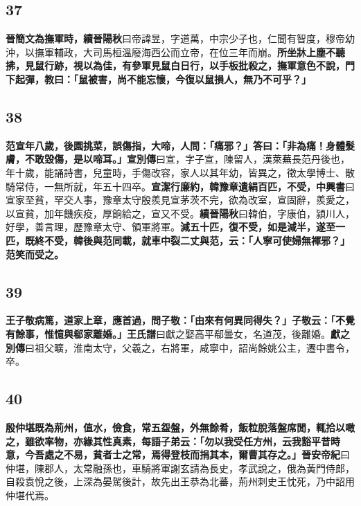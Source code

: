 \subsection*{37}

\textbf{晉簡文為撫軍時，}{\footnotesize \textbf{續晉陽秋}曰帝諱昱，字道萬，中宗少子也，仁聞有智度，穆帝幼沖，以撫軍輔政，大司馬桓溫廢海西公而立帝，在位三年而崩。}\textbf{所坐牀上塵不聽拂，見鼠行跡，視以為佳，有參軍見鼠白日行，以手板批殺之，撫軍意色不說，門下起彈，教曰：「鼠被害，尚不能忘懷，今復以鼠損人，無乃不可乎？」}

\subsection*{38}

\textbf{范宣年八歲，後園挑菜，誤傷指，大啼，人問：「痛邪？」答曰：「非為痛！身體髮膚，不敢毀傷，是以啼耳。」}{\footnotesize \textbf{宣別傳}曰宣，字子宣，陳留人，漢萊蕪長范丹後也，年十歲，能誦詩書，兒童時，手傷改容，家人以其年幼，皆異之，徵太學博士、散騎常侍，一無所就，年五十四卒。}\textbf{宣潔行廉約，韓豫章遺絹百匹，不受，}{\footnotesize \textbf{中興書}曰宣家至貧，罕交人事，豫章太守殷羨見宣茅茨不完，欲為改室，宣固辭，羨愛之，以宣貧，加年饑疾疫，厚餉給之，宣又不受。\textbf{續晉陽秋}曰韓伯，字康伯，潁川人，好學，善言理，歷豫章太守、領軍將軍。}\textbf{減五十匹，復不受，如是減半，遂至一匹，既終不受，韓後與范同載，就車中裂二丈與范，云：「人寧可使婦無褌邪？」范笑而受之。}

\subsection*{39}

\textbf{王子敬病篤，道家上章，應首過，問子敬：「由來有何異同得失？」子敬云：「不覺有餘事，惟憶與郗家離婚。」}{\footnotesize \textbf{王氏譜}曰獻之娶高平郗曇女，名道茂，後離婚。\textbf{獻之別傳}曰祖父曠，淮南太守，父羲之，右將軍，咸寧中，詔尚餘姚公主，遷中書令，卒。}

\subsection*{40}

\textbf{殷仲堪既為荊州，值水，儉食，常五盌盤，外無餘肴，飯粒脫落盤席閒，輒拾以噉之，雖欲率物，亦緣其性真素，每語子弟云：「勿以我受任方州，云我豁平昔時意，今吾處之不易，貧者士之常，焉得登枝而捐其本，爾曹其存之。」}{\footnotesize \textbf{晉安帝紀}曰仲堪，陳郡人，太常融孫也，車騎將軍謝玄請為長史，孝武說之，俄為黃門侍郎，自殺袁悅之後，上深為晏駕後計，故先出王恭為北蕃，荊州刺史王忱死，乃中詔用仲堪代焉。}


